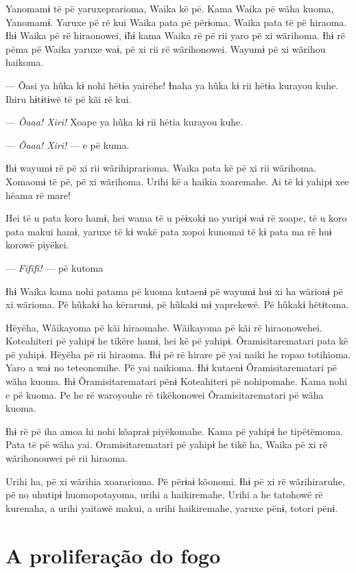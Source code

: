 Yanomamɨ të pë yaruxeprarioma, Waika kë pë. Kama Waika pë wãha kuoma,
Yanomamɨ. Yaruxe pë rë kui Waika pata pë përɨoma. Waika pata të pë
hiraoma. Ɨhɨ Waika pë rë hiraonowei, ɨ̃hɨ kama Waika rë pë rii yaro pë xi
wãrihoma. Ɨhɨ rë pëma pë Waika yaruxe waɨ, pë xi rii rë wãrihonowei.
Wayumɨ pë xi wãrihou haikoma. 

--- Õasi ya hũka kɨ nohi hëtɨa yairëhe! Ɨnaha ya hũka kɨ rii hëtɨa
kurayou kuhe. Ihiru hɨtɨtɨwë të pë kãi rë kui. 

--- \textit{Õaaa! Xiri!} Xoape ya hũka kɨ rii hëtia kurayou kuhe. 

--- \textit{Õaaa! Xiri!} --- e pë kuma. 

Ɨhɨ wayumɨ rë pë xi rii wãrihiprarioma. Waika pata kë pë xi rii
wãrihoma. Xomaomɨ të pë, pë xi wãrihoma. Urihi kë a haikia xoaremahe. Ai
të kɨ yahipɨ xee hëama rë mare! 

Hei të u pata koro hamɨ, hei wama të u pëɨxokɨ no yuripɨ waɨ rë xoape,
të u koro pata makui hamɨ, yaruxe të kɨ wakë pata xopoi kunomai të kɨ
pata ma rë huɨ korowë piyëkei. 

--- \textit{Fĩfĩfĩ!} --- pë kutoma

Ɨhɨ Waika kama nohi patama pë kuoma kutaenɨ pë wayumɨ huɨ xi ha wãrionɨ
pë xi wãrioma. Pë hũkakɨ ha kërarunɨ, pë hũkakɨ mɨ yaprekewë. Pë hũkakɨ
hëtɨtoma.

Hëyëha, Wãikayoma pë kãi hiraomahe. Wãikayoma pë kãi rë hiraonowehei.
Koteahiteri pë yahipɨ he tikëre hamɨ, hei kë pë yahipɨ.
Õramisitarematari pata kë pë yahipɨ. Hëyëha pë rii hiraoma. Ɨhɨ pë rë
hirare pë yai naiki he ropao totihioma. Yaro a waɨ no teteonomihe. Pë
yai naikioma. Ɨhɨ kutaenɨ Õramisitarematari pë wãha kuoma. Ɨhɨ
Õramisitarematari pënɨ Koteahiteri pë nohipomahe. Kama nohi e pë kuoma.
Pe he rë waroyouhe rë tikëkonowei Õramisitarematari pë wãha kuoma. 

Ɨhɨ rë pë iha amoa hi nohi kõapraɨ piyëkomahe. Kama pë yahipɨ he
tipëtëmoma. Pata të pë wãha yai. Oramisitarematari pë yahipɨ he tikë ha,
Waika pë xi rë wãrihonouwei pë rii hiraoma. 

Urihi ha, pë xi wãrihia xoararioma. Pë përɨaɨ kõonomi. Ɨhɨ pë xi rë
wãrihiraruhe, pë no uhutipɨ huomopotayoma, urihi a haikiremahe. Urihi a
he tatohowë rë kurenaha, a urihi yaitawë makui, a urihi haikiremahe,
yaruxe pënɨ, totori pënɨ. 

\chapter{A proliferação do fogo}

